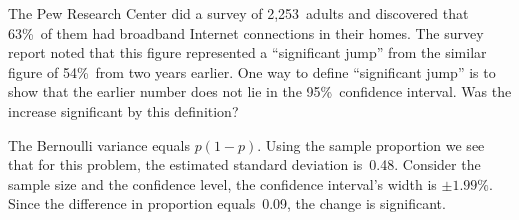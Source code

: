 \begin{problem}
   The Pew Research Center did a survey of 2,253~adults and discovered that 63\%~of them had broadband Internet connections in their homes. The survey report noted that this figure represented a ``significant jump'' from the similar figure of 54\%~from two years earlier. One way to define ``significant jump'' is to show that the earlier number does not lie in the 95\%~confidence interval. Was the increase significant by this definition?
\end{problem}

The Bernoulli variance equals ${p(1-p)}$.  Using the sample proportion we see that for this problem, the estimated standard deviation is~0.48.  Consider the sample size and the confidence level, the confidence interval's width is ${\pm1.99\%}$.  Since the difference in proportion equals~0.09, the change is significant.
